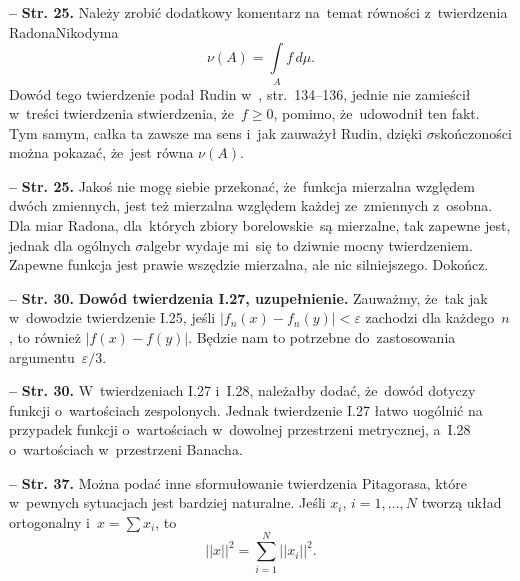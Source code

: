 \documentclass[a4paper,11pt]{article}
\newcommand{\spaceFour}{0.5em}
\newcommand{\ld}{\ldots}
\newcommand{\tb}{\textbf}
\newcommand{\noi}{\noindent}
\newcommand{\ld}{\ldots}
\newcommand{\tb}{\textbf}
\newcommand{\noi}{\noindent}
\newcommand{\start}{\noi \tb{--} {}}
\newcommand{\Str}[1]{\tb{Str. #1.}}
\providecommand{\absj}[1]{\lvert #1 \rvert}
\newcommand{\norm}[1]{\left|\left| #1 \right|\right|}
\newcommand{\veps}{\varepsilon}
\newcommand{\si}{\sigma}
\newcommand{\Sum}{\sum\limits}
\newcommand{\Int}{\int\limits}
\newcommand{\IntSet}[3]{\Int_{ #1 } #2 \, d#3} %
\newcommand{\Int}{\int\limits}
\newcommand{\Dok}{{\color{red} Dokończ.}}
\begin{document}
\vspace{\spaceFour}


\start \Str{25} Należy zrobić dodatkowy komentarz na~temat równości
z~twierdzenia Radona\dywiz Nikodyma
\begin{equation}
  \label{eq:2}
  \nu( A ) = \IntSet{ A }{ f }{ \mu }.
\end{equation}
Dowód tego twierdzenie podał Rudin w~\cite{Rudin98}, str.~134--136,
jednie nie zamieścił w~treści twierdzenia stwierdzenia, że~$f \geq 0$,
pomimo, że~udowodnił ten fakt. Tym samym, całka ta zawsze ma sens
i~jak zauważył Rudin, dzięki $\si$\dywiz skończoności można pokazać,
że~jest równa $\nu( A )$. %

\vspace{\spaceFour}


\start \Str{25} Jakoś nie mogę siebie przekonać, że~funkcja mierzalna
względem dwóch zmiennych, jest też mierzalna względem każdej
ze~zmiennych z~osobna. Dla miar Radona, dla~których zbiory
borelowskie~są mierzalne, tak zapewne jest, jednak dla ogólnych
$\si$\dywiz algebr wydaje mi~się to dziwnie mocny twierdzeniem.
Zapewne funkcja jest prawie wszędzie mierzalna, ale nic silniejszego.
\Dok

\vspace{\spaceFour}


\start \Str{30} \tb{Dowód twierdzenia I.27, uzupełnienie.} Zauważmy,
że~tak jak w~dowodzie twierdzenie I.25, jeśli
$\absj{ f_{ n }( x ) - f_{ n }( y ) } < \veps$ zachodzi dla
każdego~$n$, to również $\absj{ f( x ) - f( y ) }$. Będzie nam to
potrzebne do~zastosowania argumentu~$\veps / 3$. %

\vspace{\spaceFour}


\start \Str{30} W~twierdzeniach I.27 i~I.28, należałby dodać, że~dowód
dotyczy funkcji o~wartościach zespolonych. Jednak twierdzenie I.27
łatwo uogólnić na przypadek funkcji o~wartościach w~dowolnej
przestrzeni metrycznej, a~I.28 o~wartościach w~przestrzeni
Banacha. %

\vspace{\spaceFour}


\start \Str{37} Można podać inne sformułowanie twierdzenia Pitagorasa,
które w~pewnych sytuacjach jest bardziej naturalne. Jeśli $x_{ i }$,
$i = 1, \ld, N$ tworzą układ ortogonalny i~$x = \Sum x_{ i }$, to
\begin{equation*}
  \norm{ x }^{ 2 } = \Sum_{ i = 1 }^{ N } \norm{ x_{ i } }^{ 2 }.
\end{equation*}
\end{document}
